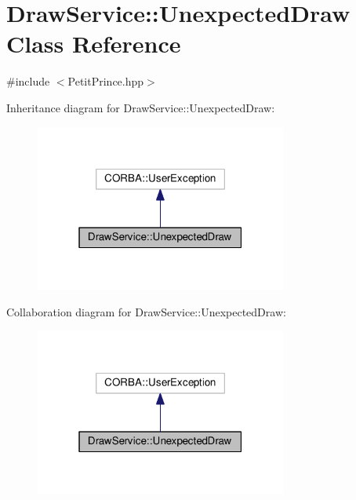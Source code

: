 \hypertarget{class_draw_service_1_1_unexpected_draw}{}\section{Draw\+Service\+:\+:Unexpected\+Draw Class Reference}
\label{class_draw_service_1_1_unexpected_draw}


{\ttfamily \#include $<$Petit\+Prince.\+hpp$>$}



Inheritance diagram for Draw\+Service\+:\+:Unexpected\+Draw\+:
\nopagebreak
\begin{figure}[H]
\begin{center}
\leavevmode
\includegraphics[width=235pt]{class_draw_service_1_1_unexpected_draw__inherit__graph}
\end{center}
\end{figure}


Collaboration diagram for Draw\+Service\+:\+:Unexpected\+Draw\+:
\nopagebreak
\begin{figure}[H]
\begin{center}
\leavevmode
\includegraphics[width=235pt]{class_draw_service_1_1_unexpected_draw__coll__graph}
\end{center}
\end{figure}

